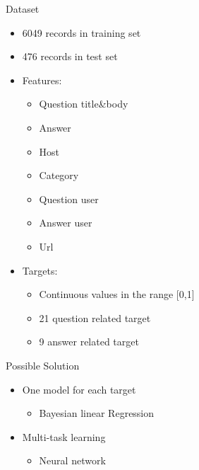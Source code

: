 \documentclass[
 size=12pt,
 paper=smartboard, %
 mode=present, %
 display=slides, %
style=tuliplab,
pauseslide,
fleqn,leqno]{powerdot}
\begin{document}
\begin{slide}{Dataset}
    \begin{itemize}
        \item 6049 records in training set
        \item 476 records in test set
        \item Features:
        \begin{itemize}
            \item Question title\&body
            \item Answer
            \item Host
            \item Category
            \item Question user
            \item Answer user
            \item Url
        \end{itemize}
        \item Targets:
        \begin{itemize}
            \item Continuous values in the range [0,1]
            \item 21 question related target
            \item 9 answer related target
        \end{itemize}
    \end{itemize}
\end{slide}
\begin{slide}{Possible Solution}
    \begin{itemize}
        \item One model for each target
        \begin{itemize}
            \item Bayesian linear Regression
        \end{itemize}
        \item Multi-task learning
        \begin{itemize}
            \item Neural network
        \end{itemize}
    \end{itemize}
\end{slide}
\end{document}
